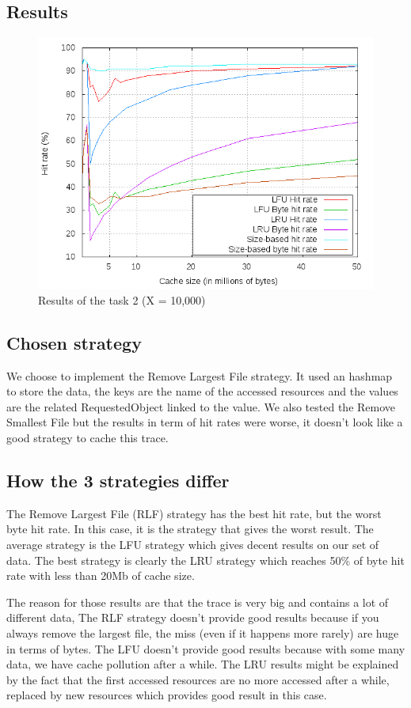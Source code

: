 \subsection{Results}

\begin{figure}[!ht]
    \centering
    \includegraphics[width=\linewidth]{task2.png}
    \caption{Results of the task 2 (X = 10,000)}
\end{figure}
\FloatBarrier

\subsection{Chosen strategy}

We choose to implement the Remove Largest File strategy. It used an hashmap
to store the data, the keys are the name of the accessed resources and the
values are the related RequestedObject linked to the value. We also tested
the Remove Smallest File but the results in term of hit rates were worse,
it doesn't look like a good strategy to cache this trace.

\subsection{How the 3 strategies differ}

The Remove Largest File (RLF) strategy has the best hit rate, but the worst byte
hit rate. In this case, it is the strategy that gives the worst result. The
average strategy is the LFU strategy which gives decent results on our set
of data. The best strategy is clearly the LRU strategy which reaches 50\%
of byte hit rate with less than 20Mb of cache size. \newline

The reason for those results are that the trace is very big and contains a
lot of different data, The RLF strategy doesn't provide good results
because if you always remove the largest file, the miss (even if it happens
more rarely) are huge in terms of bytes. The LFU doesn't provide good
results because with some many data, we have cache pollution after a while.
The LRU results might be explained by the fact that the first accessed
resources are no more accessed after a while, replaced by new resources
which provides good result in this case. \newline
